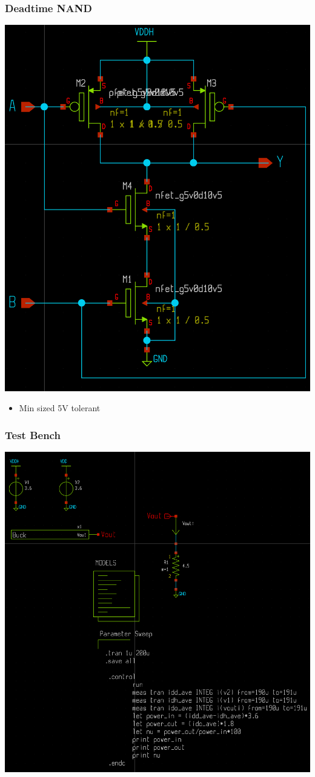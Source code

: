 \documentclass{beamer}
\begin{document}
\begin{frame}
  \frametitle{Deadtime NAND}
  \includegraphics[scale=0.09]{nand.png}
  \begin{itemize}
  \item Min sized 5V tolerant
  \end{itemize}
\end{frame}

\begin{frame}
  \frametitle{Test Bench}
  \includegraphics[scale=0.10]{testbench.png}
\end{frame}
\end{document}
